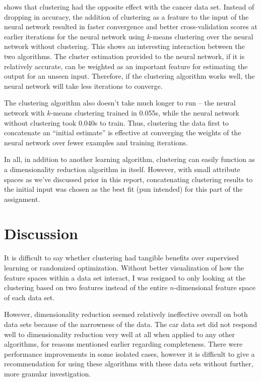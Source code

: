 \documentclass{article}
\begin{document}
     shows that clustering had the opposite effect with the cancer data set. Instead of dropping in accuracy, the addition of clustering as a feature to the input of the neural network resulted in faster convergence and better cross-validation scores at earlier iterations for the neural network using $k$-means clustering over the neural network without clustering. This shows an interesting interaction between the two algorithms. The cluster estimation provided to the neural network, if it is relatively accurate, can be weighted as an important feature for estimating the output for an unseen input. Therefore, if the clustering algorithm works well, the neural network will take less iterations to converge.

    The clustering algorithm also doesn't take much longer to run -- the neural network with $k$-means clustering trained in 0.055s, while the neural network without clustering took 0.040s to train. Thus, clustering the data first to concatenate an ``initial estimate'' is effective at converging the weights of the neural network over fewer examples and training iterations.

    In all, in addition to another learning algorithm, clustering can easily function as a dimensionality reduction algorithm in itself. However, with small attribute spaces as we've discussed prior in this report, concatenating clustering results to the initial input was chosen as the best fit (pun intended) for this part of the assignment.

  \section{Discussion}
    It is difficult to say whether clustering had tangible benefits over supervised learning or randomized optimization. Without better visualization of how the feature spaces within a data set interact, I was resigned to only looking at the clustering based on two features instead of the entire $n$-dimensional feature space of each data set.

    However, dimensionality reduction seemed relatively ineffective overall on both data sets because of the narrowness of the data. The car data set did not respond well to dimensionality reduction very well at all when applied to any other algorithms, for reasons mentioned earlier regarding completeness. There were performance improvements in some isolated cases, however it is difficult to give a recommendation for using these algorithms with these data sets without further, more granular investigation.
\end{document}
